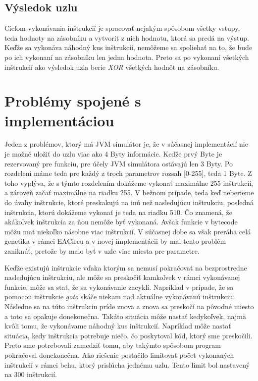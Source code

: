 \subsection{Výsledok uzlu}

Cieľom vykonávania inštrukcií je spracovať nejakým spôsobom všetky vstupy, teda hodnoty na zásobníku a vytvoriť z nich hodnotu, ktorá sa predá na výstup. Keďže sa vykonáva náhodný kus inštrukcií, nemôžeme sa spoliehať na to, že bude po ich vykonaní na zásobníku len jedna hodnota. Preto sa po vykonaní všetkých inštrukcií ako výsledok uzla berie \textit{XOR} všetkých hodnôt na zásobníku. 

\section{Problémy spojené s implementáciou}
\label{sec:problems}

Jeden z problémov, ktorý má JVM simulátor je, že v súčasnej implementácií nie je možné uložiť do uzlu viac ako 4 Byty informácie. Keďže prvý Byte je rezervovaný pre funkciu, pre účely JVM simulátora ostávajú len 3 Byty. Po rozdelení máme teda pre každý z troch parametrov rozsah [0-255], teda 1 Byte. Z toho vyplýva, že s týmto rozdelením dokážeme vykonať maximálne 255 inštrukcií, a zároveň začať maximálne na riadku 255. V bežnom prípade, teda keď neberieme do úvahy inštrukcie, ktoré preskakujú na inú než nasledujúcu inštrukciu, posledná inštrukcia, ktorú dokážeme vykonať je teda na riadku 510. Čo znamená, že akákoľvek inštrukcia za ňou nemôže byť vykonaná. Avšak funkcie v bytecode môžu mať niekoľko násobne viac inštrukcií. V súčasnej dobe sa však prerába celá genetika v rámci EACircu a v novej implementácii by mal tento problém zaniknúť, pretože by malo byť v uzle viac miesta pre parametre.

Keďže existujú inštrukcie vďaka ktorým sa nemusí pokračovať na bezprostredne nasledujúcu inštrukciu, ale môže sa preskočiť kamkoľvek v rámci vykonávanej funkcie, môže sa stať, že sa vykonávanie zacyklí. Napríklad v prípade, že sa pomocou inštrukcie \textit{goto} skáče niekam nad aktuálne vykonávanú inštrukciu. Následne sa na túto inštrukciu príde znova a znova sa preskočí na pôvodné miesto a toto sa opakuje donekonečna. Takáto situácia môže nastať kedykoľvek, najmä kvôli tomu, že vykonávame náhodný kus inštrukcií. Napríklad môže nastať situácia, kedy inštrukcia potrebuje niečo, čo poskytoval kód, ktorý sme preskočili. Preto sme potrebovali zamedziť tomu, aby takýmto spôsobom program pokračoval donekonečna. Ako riešenie postačilo limitovať počet vykonaných inštrukcií v rámci behu, ktorý prislúcha jednému uzlu. Tento limit bol nastavený na 300 inštrukcií.

